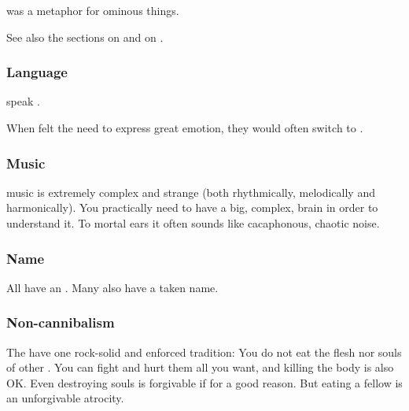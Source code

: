  was a metaphor for ominous things. 


See also the sections on  and on . 





\subsubsection{Language}
\Dragons speak . 

When \dragons felt the need to express great emotion, they would often switch to \TrueDraconic. 





\subsubsection{Music}
\Draconic{} music is extremely complex and strange (both rhythmically, melodically and harmonically). 
You practically need to have a big, complex, \draconic{} brain in order to understand it. 
To mortal ears it often sounds like cacaphonous, chaotic noise. 





\subsubsection{Name}
All \dragons{} have an . 
Many also have a taken name. 





\subsubsection{Non-cannibalism}
The \dragons{} have one rock-solid and enforced tradition: 
You do not eat the flesh nor souls of other \dragons. 
You can fight and hurt them all you want, and killing the body is also OK. 
Even destroying souls is forgivable if for a good reason. 
But eating a fellow \dragon{} is an unforgivable atrocity. 

